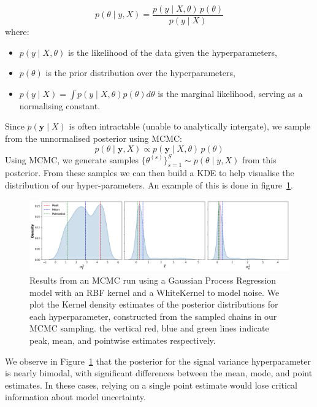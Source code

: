 \documentclass[12pt]{article}
\begin{document}
\begin{equation}
p(\theta \mid y, X) = \frac{p(y \mid X, \theta) \, p(\theta)}{p(y \mid X)}
\end{equation}
where:
\begin{itemize}
    \item \( p(y \mid X, \theta) \) is the likelihood of the data given the hyperparameters,
    \item \( p(\theta) \) is the prior distribution over the hyperparameters,
    \item \( p(y \mid X) = \int p(y \mid X,\theta)p(\theta)d\theta \) is the marginal likelihood, serving as a normalising constant.
\end{itemize}
Since \( p(\mathbf{y} \mid X) \) is often intractable (unable to analytically intergate), we sample from the unnormalised posterior using MCMC:
\begin{equation}
p(\theta \mid \mathbf{y}, X) \propto p(\mathbf{y} \mid X, \theta) \, p(\theta)
\end{equation}
%
%
Using MCMC, we generate samples \( \{\theta^{(s)}\}_{s=1}^S \sim p(\theta \mid y, X) \) from this posterior.
From these samples we can then build a KDE to help visualise the distribution of our hyper-parameters. An example of this is done in figure~\ref{fig:MCMCresults}.
\begin{figure}[H]
    \centering
    \includegraphics[width=\textwidth]{LatexPlots/1dplots/MCMCdistribution.png}
    \caption{
    Results from an MCMC run using a Gaussian Process Regression model with an RBF kernel and a WhiteKernel to model noise. We plot the Kernel density estimates of the posterior distributions for each hyperparameter, constructed from the sampled chains in our MCMC sampling. 
    the vertical red, blue and green lines indicate peak, mean, and pointwise estimates respectively.}
    \label{fig:MCMCresults}
\end{figure}
\noindent
We observe in Figure~\ref{fig:MCMCresults} that the posterior for the signal variance hyperparameter is nearly bimodal, with significant differences between the mean, mode, and point estimates. 
In these cases, relying on a single point estimate would lose critical information about model uncertainty.
\end{document}
